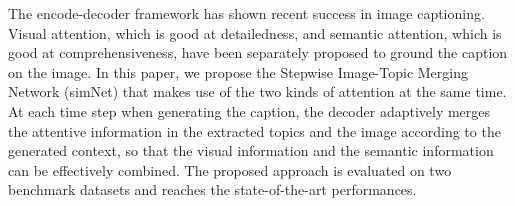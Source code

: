 The encode-decoder framework has shown recent success in image captioning. Visual attention, which is good at detailedness, and semantic attention, which is good at comprehensiveness, have been separately proposed to ground the caption on the image. In this paper, we propose the Stepwise Image-Topic Merging Network (simNet) that makes use of the two kinds of attention at the same time. At each time step when generating the caption, the decoder adaptively merges the attentive information in the extracted topics and the image according to the generated context, so that the visual information and the semantic information can be effectively combined. The proposed approach is evaluated on two benchmark datasets and reaches the state-of-the-art performances.
